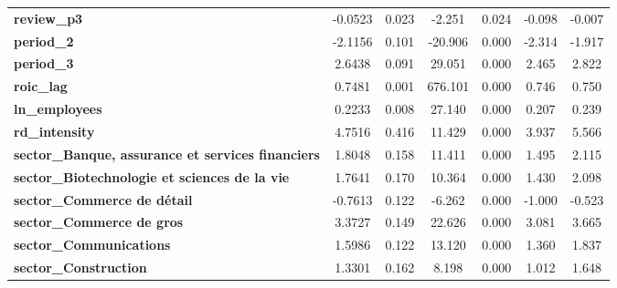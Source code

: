 \begin{center}
\begin{tabular}{lcccccc}
\textbf{review\_p3}                                                   &      -0.0523  &        0.023     &    -2.251  &         0.024        &       -0.098    &       -0.007     \\
\textbf{period\_2}                                                    &      -2.1156  &        0.101     &   -20.906  &         0.000        &       -2.314    &       -1.917     \\
\textbf{period\_3}                                                    &       2.6438  &        0.091     &    29.051  &         0.000        &        2.465    &        2.822     \\
\textbf{roic\_lag}                                                    &       0.7481  &        0.001     &   676.101  &         0.000        &        0.746    &        0.750     \\
\textbf{ln\_employees}                                                &       0.2233  &        0.008     &    27.140  &         0.000        &        0.207    &        0.239     \\
\textbf{rd\_intensity}                                                &       4.7516  &        0.416     &    11.429  &         0.000        &        3.937    &        5.566     \\
\textbf{sector\_Banque, assurance et services financiers}             &       1.8048  &        0.158     &    11.411  &         0.000        &        1.495    &        2.115     \\
\textbf{sector\_Biotechnologie et sciences de la vie}                 &       1.7641  &        0.170     &    10.364  &         0.000        &        1.430    &        2.098     \\
\textbf{sector\_Commerce de détail}                                   &      -0.7613  &        0.122     &    -6.262  &         0.000        &       -1.000    &       -0.523     \\
\textbf{sector\_Commerce de gros}                                     &       3.3727  &        0.149     &    22.626  &         0.000        &        3.081    &        3.665     \\
\textbf{sector\_Communications}                                       &       1.5986  &        0.122     &    13.120  &         0.000        &        1.360    &        1.837     \\
\textbf{sector\_Construction}                                         &       1.3301  &        0.162     &     8.198  &         0.000        &        1.012    &        1.648     \\

\end{tabular}
\end{center}
